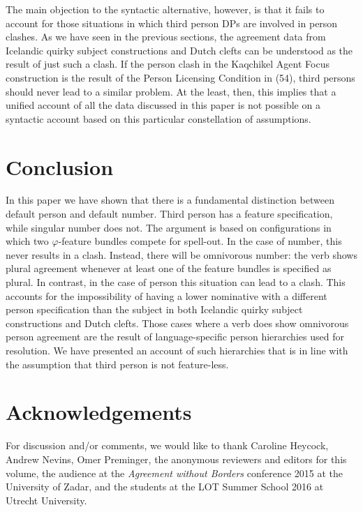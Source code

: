 \documentclass[output=paper]{langsci/langscibook}
\begin{document}
  The main objection to the syntactic alternative, however, is that it fails to account for those situations in which third person DPs are involved in person clashes. As we have seen in the previous sections, the agreement data from Icelandic quirky subject constructions and Dutch clefts can be understood as the result of just such a clash. If the person clash in the Kaqchikel Agent Focus construction is the result of the Person Licensing Condition in (54), third persons should never lead to a similar problem. At the least, then, this implies that a unified account of all the data discussed in this paper is not possible on a syntactic account based on this particular constellation of assumptions.

\section{Conclusion}
In this paper we have shown that there is a fundamental distinction between default person and default number. Third person has a feature specification, while singular number does not. The argument is based on configurations in which two $\varphi $-feature bundles compete for spell-out. In the case of number, this never results in a clash. Instead, there will be omnivorous number: the verb shows plural agreement whenever at least one of the feature bundles is specified as plural. In contrast, in the case of person this situation can lead to a clash. This accounts for the impossibility of having a lower nominative with a different person specification than the subject in both Icelandic quirky subject constructions and Dutch clefts. Those cases where a verb does show omnivorous person agreement are the result of language-specific person hierarchies used for resolution. We have presented an account of such hierarchies that is in line with the assumption that third person is not feature-less. 

\section*{Acknowledgements}
For discussion and/or comments, we would like to thank Caroline Heycock, Andrew Nevins, Omer Preminger, the anonymous reviewers and editors for this volume, the audience at the \textit{Agreement without Borders} conference 2015 at the University of Zadar, and the students at the LOT Summer School 2016 at Utrecht University.
\end{document}
